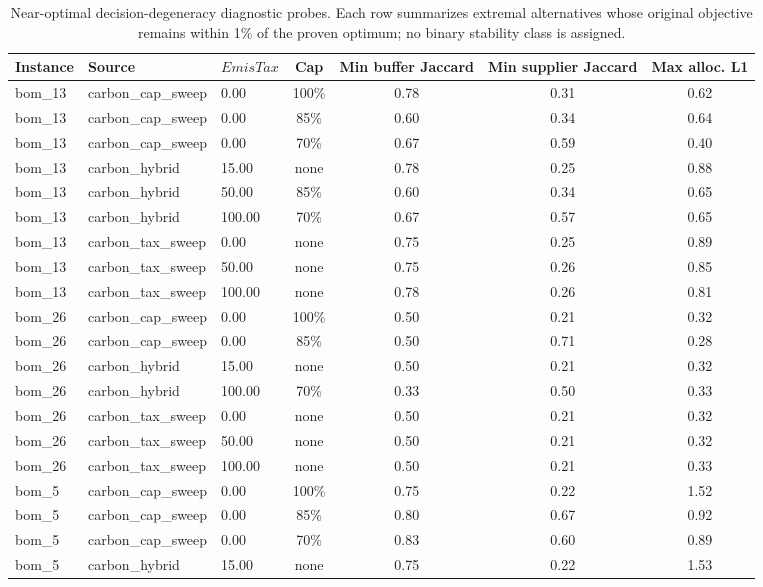 \begin{table}[!htbp]\centering\small
\caption{Near-optimal decision-degeneracy diagnostic probes. Each row summarizes extremal alternatives whose original objective remains within 1\% of the proven optimum; no binary stability class is assigned.}\label{tab:stability}
\begin{tabular}{lllcccc}
\toprule
Instance & Source & $EmisTax$ & Cap & Min buffer Jaccard & Min supplier Jaccard & Max alloc. L1\\
\midrule
bom\_13 & carbon\_cap\_sweep & 0.00 & 100\% & 0.78 & 0.31 & 0.62 \\
bom\_13 & carbon\_cap\_sweep & 0.00 & 85\% & 0.60 & 0.34 & 0.64 \\
bom\_13 & carbon\_cap\_sweep & 0.00 & 70\% & 0.67 & 0.59 & 0.40 \\
bom\_13 & carbon\_hybrid & 15.00 & none & 0.78 & 0.25 & 0.88 \\
bom\_13 & carbon\_hybrid & 50.00 & 85\% & 0.60 & 0.34 & 0.65 \\
bom\_13 & carbon\_hybrid & 100.00 & 70\% & 0.67 & 0.57 & 0.65 \\
bom\_13 & carbon\_tax\_sweep & 0.00 & none & 0.75 & 0.25 & 0.89 \\
bom\_13 & carbon\_tax\_sweep & 50.00 & none & 0.75 & 0.26 & 0.85 \\
bom\_13 & carbon\_tax\_sweep & 100.00 & none & 0.78 & 0.26 & 0.81 \\
bom\_26 & carbon\_cap\_sweep & 0.00 & 100\% & 0.50 & 0.21 & 0.32 \\
bom\_26 & carbon\_cap\_sweep & 0.00 & 85\% & 0.50 & 0.71 & 0.28 \\
bom\_26 & carbon\_hybrid & 15.00 & none & 0.50 & 0.21 & 0.32 \\
bom\_26 & carbon\_hybrid & 100.00 & 70\% & 0.33 & 0.50 & 0.33 \\
bom\_26 & carbon\_tax\_sweep & 0.00 & none & 0.50 & 0.21 & 0.32 \\
bom\_26 & carbon\_tax\_sweep & 50.00 & none & 0.50 & 0.21 & 0.32 \\
bom\_26 & carbon\_tax\_sweep & 100.00 & none & 0.50 & 0.21 & 0.33 \\
bom\_5 & carbon\_cap\_sweep & 0.00 & 100\% & 0.75 & 0.22 & 1.52 \\
bom\_5 & carbon\_cap\_sweep & 0.00 & 85\% & 0.80 & 0.67 & 0.92 \\
bom\_5 & carbon\_cap\_sweep & 0.00 & 70\% & 0.83 & 0.60 & 0.89 \\
bom\_5 & carbon\_hybrid & 15.00 & none & 0.75 & 0.22 & 1.53 \\

\end{tabular}
\end{table}
